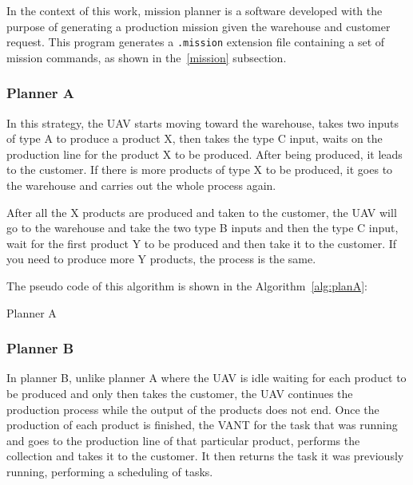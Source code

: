 \documentclass[conference,harvard,brazil,english]{sbatex}
\begin{document}
In the context of this work, mission planner is a software developed with the purpose of generating a production mission given the warehouse and customer request. This program generates a \texttt{.mission} extension file containing a set of mission commands, as shown in the~\ref{mission} subsection.

\subsubsection{Planner A}

In this strategy, the UAV starts moving toward the warehouse, takes two inputs of type A to produce a product X, then takes the type C input, waits on the production line for the product X to be produced. After being produced, it leads to the customer. If there is more products of type X to be produced, it goes to the warehouse and carries out the whole process again.

After all the X products are produced and taken to the customer, the UAV will go to the warehouse and take the two type B inputs and then the type C input, wait for the first product Y to be produced and then take it to the customer. If you need to produce more Y products, the process is the same.

The pseudo code of this algorithm is shown in the Algorithm~\ref{alg:planA}:

\begin{algorithm}[H]
\footnotesize
{}
\captionsetup{list=no}
\caption{Planner A}\label{alg:planA}
\end{algorithm}

\subsubsection{Planner B}
In planner B, unlike planner A where the UAV is idle waiting for each product to be produced and only then takes the customer, the UAV continues the production process while the output of the products does not end. Once the production of each product is finished, the VANT for the task that was running and goes to the production line of that particular product, performs the collection and takes it to the customer. It then returns the task it was previously running, performing a scheduling of tasks.
\end{document}

